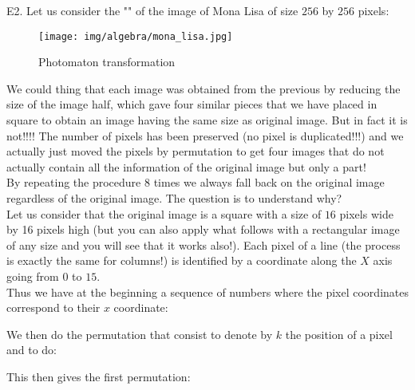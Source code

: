 	\pagebreak
	\begin{tcolorbox}[colframe=black,colback=white,sharp corners]
	E2. Let us consider the "" of the image of Mona Lisa of size $256$ by $256$ pixels:
	\begin{figure}[H]
		\centering
		\texttt{[image: img/algebra/mona\_lisa.jpg]}
		\caption{Photomaton transformation}
	\end{figure}
	We could thing that each image was obtained from the previous by reducing the size of the image half, which gave four similar pieces that we have placed in square to obtain an image having the same size as original image. But in fact it is not!!!! The number of pixels has been preserved (no pixel is duplicated!!!) and we actually just moved the pixels by permutation to get four images that do not actually contain all the information of the original image but only a part!\\
	
	By repeating the procedure $8$ times we always fall back on the original image regardless of the original image. The question is to understand why?\\
	
	Let us consider that the original image is a square with a size of $16$ pixels wide by 16 pixels high (but you can also apply what follows with a rectangular image of any size and you will see that it works also!). Each pixel of a line (the process is exactly the same for columns!) is identified by a coordinate along the $X$ axis going from $0$ to $15$.\\
	
	Thus we have at the beginning a sequence of numbers where the pixel coordinates correspond to their $x$ coordinate:
	
	We then do the permutation that consist to denote by $k$ the position of a pixel and to do:
	
	This then gives the first permutation:
	\end{tcolorbox}

